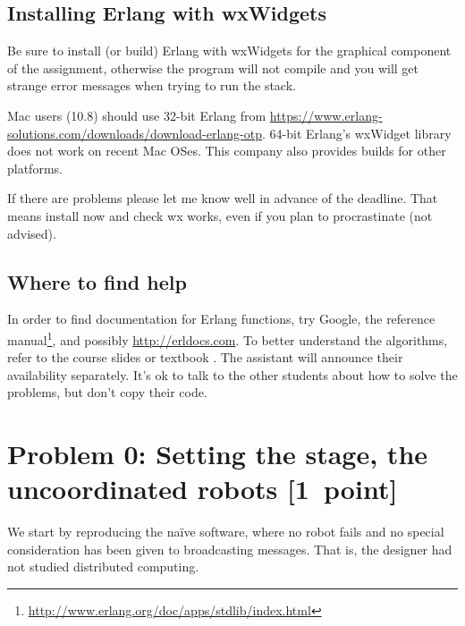 \documentclass[a4paper]{article}
\begin{document}


\subsection*{Installing Erlang with wxWidgets} %
\label{sub:installing_erlang_and_wx}

Be sure to install (or build) Erlang with wxWidgets for the graphical
component of the assignment, otherwise the program will not compile and you
will get strange error messages when trying to run the stack.

Mac users (10.8) should use 32-bit Erlang from
\url{https://www.erlang-solutions.com/downloads/download-erlang-otp}. 64-bit
Erlang's wxWidget library does not work on recent Mac OSes. This
company also provides builds for other platforms.

If there are problems please let me know well in advance of the deadline.
That means install now and check wx works, even if you plan to procrastinate
(not advised).



\subsection*{Where to find help} %
\label{sub:where_to_find_help}

In order to find documentation for Erlang functions, try Google, the reference
manual\footnote{\url{http://www.erlang.org/doc/apps/stdlib/index.html}}, and
possibly \url{http://erldocs.com}.
To better understand the algorithms, refer to the course slides or textbook
\cite{cachin2011}.
The assistant will announce their availability separately.
It's ok to talk to the other students about how to solve the problems, but
don't copy their code.







\section*{Problem 0: Setting the stage, the uncoordinated robots [1~point]} %
\label{sec:section_name}

We start by reproducing the naïve software, where no robot fails and no
special consideration has been given to broadcasting messages. That is, the
designer had not studied distributed computing.
\end{document}
